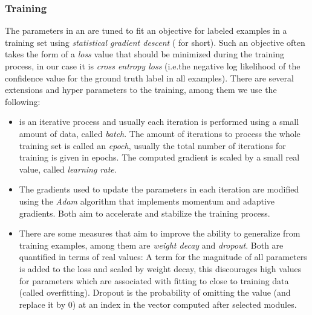 \documentclass[../document.tex]{subfiles}
\begin{document}
    \subsubsection{Training}
    The parameters in an  are tuned to fit an objective for labeled examples in a training set using \emph{statistical gradient descent} ( for short).
    Such an objective often takes the form of a \emph{loss} value that should be minimized during the training process, in our case it is \emph{cross entropy loss} (i.e.\@ the negative log likelihood of the confidence value for the ground truth label in all examples).
    There are several extensions and hyper parameters to the training, among them we use the following:
    \begin{itemize}
        \item
             is an iterative process and usually each iteration is performed using a small amount of data, called \emph{batch}.
            The amount of iterations to process the whole training set is called an \emph{epoch}, usually the total number of iterations for training is given in epochs.
            The computed gradient is scaled by a small real value, called \emph{learning rate}.
        \item
            The gradients used to update the parameters in each iteration are modified using the \emph{Adam} algorithm that implements momentum and adaptive gradients.
            Both aim to accelerate and stabilize the training process.
        \item
            There are some measures that aim to improve the ability to generalize from training examples, among them are \emph{weight decay} and \emph{dropout}.
            Both are quantified in terms of real values:
                A term for the magnitude of all parameters is added to the loss and scaled by weight decay, this discourages high values for parameters which are associated with fitting to close to training data (called overfitting).
                Dropout is the probability of omitting the value (and replace it by \(0\)) at an index in the vector computed after selected modules.
    \end{itemize}
\end{document}
